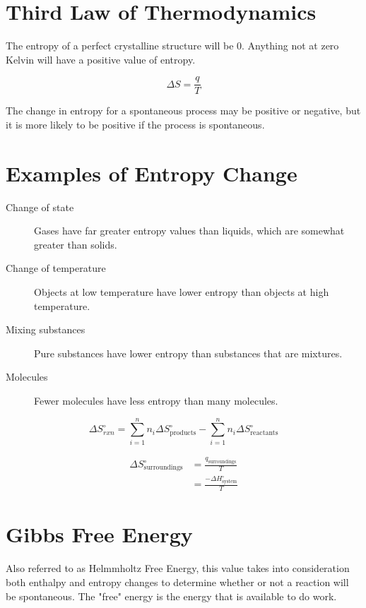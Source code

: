 \section{Third Law of Thermodynamics}
The entropy of a perfect crystalline structure will be $0$. Anything not at zero
Kelvin will have a positive value of entropy.

\begin{equation}
  \Delta S = \frac{q}{T}
\end{equation}

The change in entropy for a spontaneous process may be positive or negative, but
it is more likely to be positive if the process is spontaneous.

\section{Examples of Entropy Change}
\begin{description}
  \item[Change of state] Gases have far greater entropy values than liquids,
    which are somewhat greater than solids.
  \item[Change of temperature] Objects at low temperature have lower entropy
    than objects at high temperature.
  \item[Mixing substances] Pure substances have lower entropy than substances
    that are mixtures.
  \item[Molecules] Fewer molecules have less entropy than many molecules.
\end{description}

\begin{equation}
  \Delta S^{\circ}_{rxn} = \sum_{i=1}^{n} n_i\Delta S^{\circ}_{\text{products}} -
  \sum_{i=1}^{n} n_i\Delta S^{\circ}_{\text{reactants}}
\end{equation}

\begin{equation}
  \begin{aligned}
    \Delta S^{\circ}_{\text{surroundings}} &= \frac{q_{\text{surroundings}}}{T}\\
    &= \frac{-\Delta H^{\circ}_{\text{system}}}{T}
  \end{aligned}
\end{equation}

\section{Gibbs Free Energy}
Also referred to as Helmmholtz Free Energy, this value takes into consideration
both enthalpy and entropy changes to determine whether or not a reaction will be
spontaneous. The "free" energy is the energy that is available to do work.

